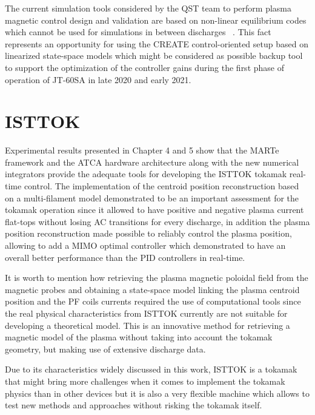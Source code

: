  The current simulation tools  considered by the QST team  to perform plasma magnetic control design and validation are based on  non-linear equilibrium codes which cannot be used for  simulations in between discharges ~\cite{MECS}. This fact represents an opportunity for using the CREATE  control-oriented setup based on  linearized state-space models which might  be considered as possible backup tool to support the optimization of the controller gains during the first phase of operation of JT-60SA in late 2020 and early 2021.


\section{ISTTOK}

Experimental results presented in Chapter 4 and 5 show that the MARTe framework and the ATCA hardware architecture along with the new numerical integrators provide the adequate tools for developing the ISTTOK tokamak real-time control. The implementation of the centroid position reconstruction based on a multi-filament model demonstrated to be an important assessment for the tokamak operation since  it allowed to have  positive and negative plasma current flat-tops without losing AC transitions for every discharge, in addition the plasma position reconstruction made  possible to reliably control the plasma position, allowing to add a MIMO optimal controller which demonstrated to have an overall better performance than the PID controllers in real-time. \smallskip


It is worth to mention how retrieving the plasma magnetic poloidal field from the magnetic probes and obtaining a state-space model linking the plasma centroid position and the PF coils currents required the use of computational tools since the real physical characteristics from ISTTOK currently are not suitable for developing a theoretical model. This is an innovative method for retrieving a magnetic model of the plasma without taking into account the tokamak geometry, but making use of extensive discharge data.\smallskip

Due to its characteristics widely discussed in this work, ISTTOK is a tokamak that might bring  more challenges when it comes to implement the tokamak physics than in other devices but it is also a very flexible machine which allows to test new methods and approaches without risking the tokamak itself.\smallskip

